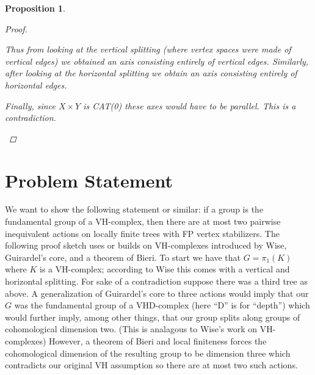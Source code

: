 \documentclass{article}
\theoremstyle{mystyle}
\newtheorem{pro}{Proposition}
\theoremstyle{remark}
\begin{document}
\begin{pro}
\begin{proof}
\begin{enumerate}
    Thus from looking at the vertical splitting (where vertex spaces were made of vertical edges) we obtained an axis consisting entirely of vertical edges. Similarly, after looking at the horizontal splitting we obtain an axis consisting entirely of horizontal edges. 
    
    Finally, since $X \times Y$ is CAT(0) these axes would have to be parallel. This is a contradiction.
\end{enumerate}
\end{proof}
\end{pro}


\section{Problem Statement}
We want to show the following statement or similar: if a group is the fundamental group of a VH-complex, then there are at most two pairwise inequivalent actions on locally finite trees with FP vertex stabilizers. The following proof sketch uses or builds on VH-complexes introduced by Wise, Guirardel's core, and a theorem of Bieri. To start we have that \(G = \pi_1(K)\) where \(K\) is a VH-complex; according to Wise this comes with a vertical and horizontal splitting. For sake of a contradiction suppose there was a third tree as above. A generalization of Guirardel's core to three actions would imply that our \(G\) was the fundamental group of a VHD-complex (here ``D'' is for ``depth'') which would further imply, among other things, that our group splits along groups of cohomological dimension two. (This is analagous to Wise's work on VH-complexes) However, a theorem of Bieri and local finiteness forces the cohomological dimension of the resulting group to be dimension three which contradicts our original VH assumption so there are at most two such actions.
\end{document}
